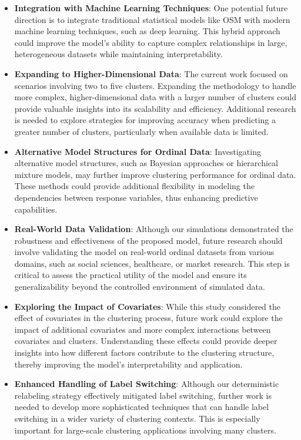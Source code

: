 \documentclass{article}
\begin{document}
\begin{itemize}
    \item \textbf{Integration with Machine Learning Techniques}: One potential future direction is to integrate traditional statistical models like OSM with modern machine learning techniques, such as deep learning. This hybrid approach could improve the model's ability to capture complex relationships in large, heterogeneous datasets while maintaining interpretability.

    \item \textbf{Expanding to Higher-Dimensional Data}: The current work focused on scenarios involving two to five clusters. Expanding the methodology to handle more complex, higher-dimensional data with a larger number of clusters could provide valuable insights into its scalability and efficiency. Additional research is needed to explore strategies for improving accuracy when predicting a greater number of clusters, particularly when available data is limited.

    \item \textbf{Alternative Model Structures for Ordinal Data}: Investigating alternative model structures, such as Bayesian approaches or hierarchical mixture models, may further improve clustering performance for ordinal data. These methods could provide additional flexibility in modeling the dependencies between response variables, thus enhancing predictive capabilities.

    \item \textbf{Real-World Data Validation}: Although our simulations demonstrated the robustness and effectiveness of the proposed model, future research should involve validating the model on real-world ordinal datasets from various domains, such as social sciences, healthcare, or market research. This step is critical to assess the practical utility of the model and ensure its generalizability beyond the controlled environment of simulated data.

    \item \textbf{Exploring the Impact of Covariates}: While this study considered the effect of covariates in the clustering process, future work could explore the impact of additional covariates and more complex interactions between covariates and clusters. Understanding these effects could provide deeper insights into how different factors contribute to the clustering structure, thereby improving the model's interpretability and application.

    \item \textbf{Enhanced Handling of Label Switching}: Although our deterministic relabeling strategy effectively mitigated label switching, further work is needed to develop more sophisticated techniques that can handle label switching in a wider variety of clustering contexts. This is especially important for large-scale clustering applications involving many clusters.

\end{itemize}
\end{document}
